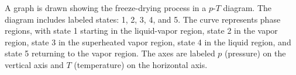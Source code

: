 A graph is drawn showing the freeze-drying process in a \( p \)-\( T \) diagram. The diagram includes labeled states: 1, 2, 3, 4, and 5. The curve represents phase regions, with state 1 starting in the liquid-vapor region, state 2 in the vapor region, state 3 in the superheated vapor region, state 4 in the liquid region, and state 5 returning to the vapor region. The axes are labeled \( p \) (pressure) on the vertical axis and \( T \) (temperature) on the horizontal axis.